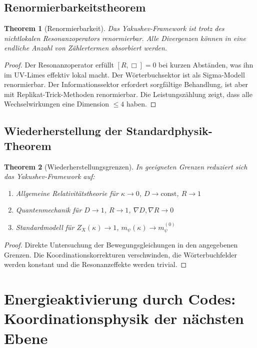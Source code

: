 \documentclass[11pt,a4paper]{article}
\newtheorem{theorem}{Theorem}
\begin{document}
	\subsection{Renormierbarkeitstheorem}
	
	\begin{theorem}[Renormierbarkeit]
		Das Yakushev-Framework ist trotz des nichtlokalen Resonanzoperators renormierbar. Alle Divergenzen können in eine endliche Anzahl von Zählertermen absorbiert werden.
	\end{theorem}
	
	\begin{proof}
		Der Resonanzoperator erfüllt $[R, \Box] = 0$ bei kurzen Abständen, was ihn im UV-Limes effektiv lokal macht. Der Wörterbuchsektor ist als Sigma-Modell renormierbar. Der Informationssektor erfordert sorgfältige Behandlung, ist aber mit Replikat-Trick-Methoden renormierbar. Die Leistungszählung zeigt, dass alle Wechselwirkungen eine Dimension $\leq 4$ haben.
	\end{proof}
	
	\subsection{Wiederherstellung der Standardphysik-Theorem}
	
	\begin{theorem}[Wiederherstellungsgrenzen]
		In geeigneten Grenzen reduziert sich das Yakushev-Framework auf:
		\begin{enumerate}
			\item Allgemeine Relativitätstheorie für $\kappa \to 0$, $D \to \text{const}$, $R \to 1$
			\item Quantenmechanik für $D \to 1$, $R \to 1$, $\nabla D, \nabla R \to 0$
			\item Standardmodell für $Z_X(\kappa) \to 1$, $m_\psi(\kappa) \to m_\psi^{(0)}$
		\end{enumerate}
	\end{theorem}
	
	\begin{proof}
		Direkte Untersuchung der Bewegungsgleichungen in den angegebenen Grenzen. Die Koordinationskorrekturen verschwinden, die Wörterbuchfelder werden konstant und die Resonanzeffekte werden trivial.
	\end{proof}
	
	\section{Energieaktivierung durch Codes: Koordinationsphysik der nächsten Ebene}
	\label{sec:energy-activation}
	
\end{document}
